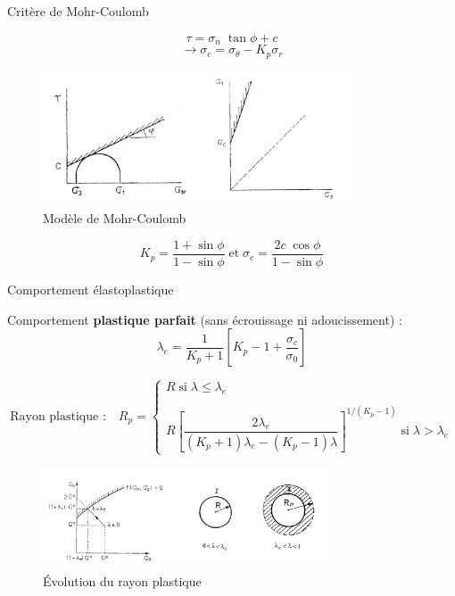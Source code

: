 \documentclass{beamer}
\begin{document}
\begin{frame}{Critère de Mohr-Coulomb}

\[\tau=\sigma_n\;\tan\phi+c\]
\[\longrightarrow \sigma_c=\sigma_{\theta}-K_p\sigma_r\]

\begin{figure}
    \centering
    \includegraphics[height=4cm]{MohrCoulomb.png}
    \caption{\scriptsize{Modèle de Mohr-Coulomb}}
    \label{MohrCoulomb}
\end{figure}
\vspace{-0.3cm}
\[K_p=\dfrac{1+\sin\phi}{1-\sin\phi}\;\text{et}\;\sigma_c=\dfrac{2c\;\cos\phi}{1-\sin\phi}\]
    
\end{frame}



\begin{frame}{Comportement élastoplastique}

Comportement \textbf{plastique parfait} (sans écrouissage ni adoucissement) :\[\lambda_e=\dfrac{1}{K_p+1}\left[K_p-1+\dfrac{\sigma_c}{\sigma_0}\right]\]

\[\text{Rayon plastique :}\quad R_p=\left\{\begin{array}{l}R\;\text{si}\;\lambda\leq\lambda_e\\ \\
R\left[\dfrac{2\lambda_e}{(K_p+1)\lambda_e-(K_p-1)\lambda}\right]^{1/(K_p-1)} \;\text{si}\;\lambda>\lambda_e\end{array}\right.\]

\begin{figure}
    \centering
    \includegraphics[height=3cm]{RpTh.png}
    \caption{\scriptsize{Évolution du rayon plastique}}
    \label{RpTh}
\end{figure}
    
\end{frame}
\end{document}

